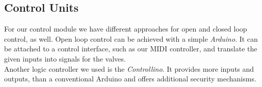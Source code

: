 \subsection{Control Units}
For our control module we have different approaches for open and closed loop control, as well. Open loop control can be achieved with a simple \textit{Arduino}. It can be attached to a control interface, such as our MIDI controller, and translate the given inputs into signals for the valves.\\
Another logic controller we used is the \textit{Controllino}. It provides more inputs and outputs, than a conventional Arduino and offers additional security mechanisms.
